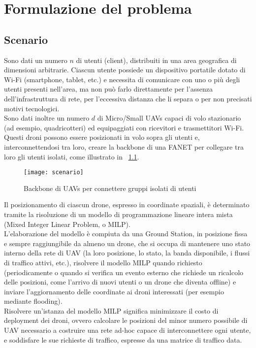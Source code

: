  \chapter{Formulazione del problema}

\ifpdf
    \graphicspath{{Chapter3/Figs/Raster/}{Chapter3/Figs/PDF/}{Chapter3/Figs/}}
\else
    \graphicspath{{Chapter3/Figs/Vector/}{Chapter3/Figs/}}
\fi

\section{Scenario}
Sono dati un numero $n$ di utenti (client), distribuiti in una area geografica di dimensioni arbitrarie. 
Ciascun utente possiede un dispositivo portatile dotato di Wi-Fi (smartphone, tablet, etc.) e necessita di comunicare con uno o più degli utenti presenti nell'area, ma non può farlo direttamente per l'assenza dell'infrastruttura di rete, per l'eccessiva distanza che li separa o per non precisati motivi tecnologici. \\
Sono dati inoltre un numero $d$ di Micro/Small UAVs capaci di volo stazionario (ad esempio, quadricotteri) ed equipaggiati con ricevitori e trasmettitori Wi-Fi. 
Questi droni possono essere posizionati in volo sopra gli utenti e, interconnettendosi tra loro, creare la backbone di una FANET per collegare tra loro gli utenti isolati, come illustrato in \figurename\ \ref{fig:scenario}. \\

\begin{figure}
	\begin{center}
		\texttt{[image: scenario]}
	\end{center}
	\caption{Backbone di UAVs per connettere gruppi isolati di utenti} \label{fig:scenario}
\end{figure}

Il posizionamento di ciascun drone, espresso in coordinate spaziali, è determinato tramite la risoluzione di un modello di programmazione lineare intera mista (Mixed Integer Linear Problem, o MILP). \\
L'elaborazione del modello è compiuta da una Ground Station, in posizione fissa e sempre raggiungibile da almeno un drone, che si occupa di mantenere uno stato interno della rete di UAV (la loro posizione, lo stato, la banda disponibile, i flussi di traffico attivi, etc.), risolvere il modello MILP quando richiesto (periodicamente o quando si verifica un evento esterno che richiede un ricalcolo delle posizioni, come l'arrivo di nuovi utenti o un drone che diventa offline) e inviare l'aggiornamento delle coordinate ai droni interessati (per esempio mediante flooding). \\
Risolvere un'istanza del modello MILP significa minimizzare il costo di deployment dei droni, ovvero calcolare le posizioni del minor numero possibile di UAV necessario a costruire una rete ad-hoc capace di interconnettere ogni utente, e soddisfare le sue richieste di traffico, espresse da una matrice di traffico data. \\

